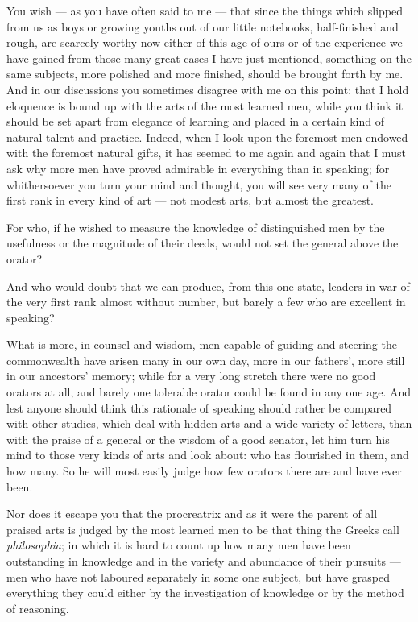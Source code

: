  You wish — as you have often said to me — that since the things which slipped from us as boys or growing youths out of our little notebooks, half-finished and rough, are scarcely worthy now either of this age of ours or of the experience we have gained from those many great cases I have just mentioned, something on the same subjects, more polished and more finished, should be brought forth by me. And in our discussions you sometimes disagree with me on this point: that I hold eloquence is bound up with the arts of the most learned men, while you think it should be set apart from elegance of learning and placed in a certain kind of natural talent and practice. Indeed, when I look upon the foremost men endowed with the foremost natural gifts, it has seemed to me again and again that I must ask why more men have proved admirable in everything than in speaking; for whithersoever you turn your mind and thought, you will see very many of the first rank in every kind of art — not modest arts, but almost the greatest.

 For who, if he wished to measure the knowledge of distinguished men by the usefulness or the magnitude of their deeds, would not set the general above the orator?

 And who would doubt that we can produce, from this one state, leaders in war of the very first rank almost without number, but barely a few who are excellent in speaking?

 What is more, in counsel and wisdom, men capable of guiding and steering the commonwealth have arisen many in our own day, more in our fathers', more still in our ancestors' memory; while for a very long stretch there were no good orators at all, and barely one tolerable orator could be found in any one age. And lest anyone should think this rationale of speaking should rather be compared with other studies, which deal with hidden arts and a wide variety of letters, than with the praise of a general or the wisdom of a good senator, let him turn his mind to those very kinds of arts and look about: who has flourished in them, and how many. So he will most easily judge how few orators there are and have ever been.

 Nor does it escape you that the procreatrix and as it were the parent of all praised arts is judged by the most learned men to be that thing the Greeks call \textit{philosophia}; in which it is hard to count up how many men have been outstanding in knowledge and in the variety and abundance of their pursuits — men who have not laboured separately in some one subject, but have grasped everything they could either by the investigation of knowledge or by the method of reasoning.

